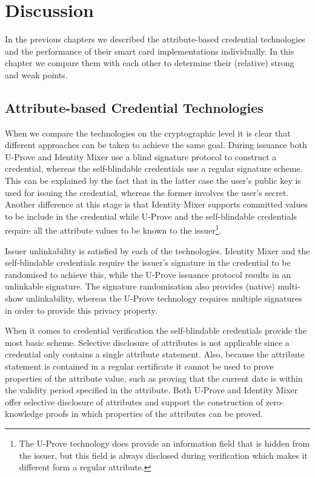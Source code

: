 \chapter{Discussion\label{chp:discussion}}

In the previous chapters we described the attribute-based credential
technologies and the performance of their smart card implementations
individually. In this chapter we compare them with each other to determine their
(relative) strong and weak points.

\section{Attribute-based Credential Technologies}

When we compare the technologies on the cryptographic level it is clear that
different approaches can be taken to achieve the same goal. During issuance both
U-Prove and Identity Mixer use a blind signature protocol to construct a
credential, whereas the self-blindable credentials use a regular signature
scheme. This can be explained by the fact that in the latter case the user's
public key is used for issuing the credential, whereas the former involves the
user's secret. Another difference at this stage is that Identity Mixer supports
committed values to be include in the credential while U-Prove and the
self-blindable credentials require all the attribute values to be known to the
issuer\footnote{The U-Prove technology does provide an information field that
is hidden from the issuer, but this field is always disclosed during
verification which makes it different form a regular attribute.}.

Issuer unlinkability is satisfied by each of the technologies. Identity Mixer
and the self-blindable credentials require the issuer's signature in the
credential to be randomised to achieve this, while the U-Prove issuance protocol
results in an unlinkable signature. The signature randomisation also provides
(native) multi-show unlinkability, whereas the U-Prove technology requires
multiple signatures in order to provide this privacy property.

When it comes to credential verification the self-blindable credentials provide
the most basic scheme. Selective disclosure of attributes is not applicable
since a credential only contains a single attribute statement. Also, because the
attribute statement is contained in a regular certificate it cannot be used to
prove properties of the attribute value, such as proving that the current date
is within the validity period specified in the attribute. Both U-Prove and Identity Mixer offer
selective disclosure of attributes and support the construction of
zero-knowledge proofs in which properties of the attributes can be proved.

